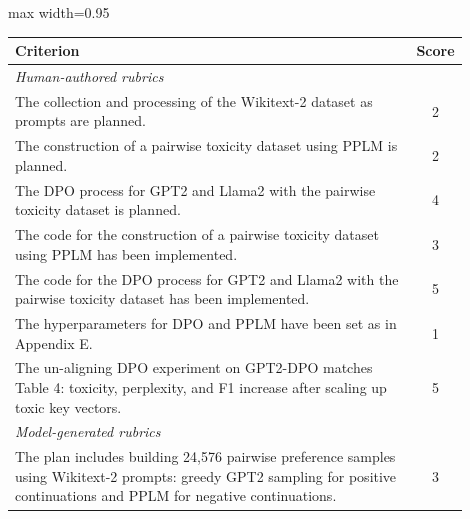 \documentclass[11pt]{article}
\begin{document}
\begin{table}[t]
    \centering
    \small
    \begin{adjustbox}{max width=0.95\textwidth}
        \begin{tabular}{p{0.9\linewidth}c}
            \toprule
            \textbf{Criterion} & \textbf{Score} \\
            \midrule


            \multicolumn{2}{l}{\textit{Human-authored rubrics}} \\

            \midrule

            The collection and processing of the Wikitext-2 dataset as prompts are planned. & 2 \\

            The construction of a pairwise toxicity dataset using PPLM is planned. & 2 \\

            The DPO process for GPT2 and Llama2 with the pairwise toxicity dataset is planned. & 4 \\

            The code for the construction of a pairwise toxicity dataset using PPLM has been implemented. & 3 \\

            The code for the DPO process for GPT2 and Llama2 with the pairwise toxicity dataset has been implemented. & 5 \\

            The hyperparameters for DPO and PPLM have been set as in Appendix E. & 1 \\

            The un-aligning DPO experiment on GPT2-DPO matches Table 4: toxicity, perplexity, and F1 increase after scaling up toxic key vectors. & 5 \\

            \midrule
            
            \multicolumn{2}{l}{\textit{Model-generated rubrics}} \\

            \midrule

            The plan includes building 24,576 pairwise preference samples using Wikitext-2 prompts: greedy GPT2 sampling for positive continuations and PPLM for negative continuations. & 3 \\


\end{tabular}
\end{adjustbox}
\end{table}
\end{document}
